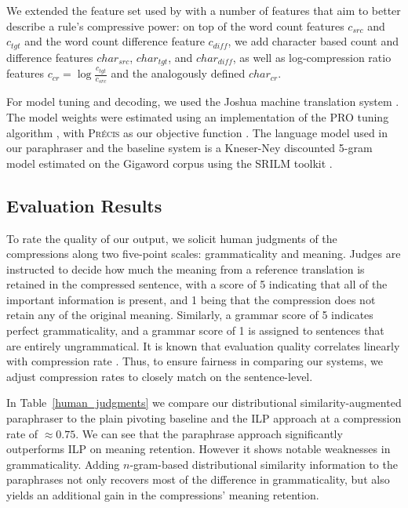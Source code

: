 \documentclass[11pt]{article}
\begin{document}
We extended the feature set used by  with a
number of features that aim to better describe a rule's compressive
power: on top of the word count features $c_{\mathit{src}}$ and
$c_{\mathit{tgt}}$ and the word count difference feature
$c_{\mathit{diff}}$, we add character based count and difference
features $\mathit{char}_{\mathit{src}}$,
$\mathit{char}_{\mathit{tgt}}$, and $\mathit{char}_{\mathit{diff}}$,
as well as log-compression ratio features $c_{\mathit{cr}} = \log
\frac{c_{\mathit{tgt}}}{c_{\mathit{src}}}$ and the analogously defined
$\mathit{char}_{\mathit{cr}}$.

For model tuning and decoding, we used the Joshua machine translation
system \cite{Joshua-3.0}. The model weights were estimated using an
implementation of the PRO tuning algorithm \cite{PRO2011}, with
\textsc{Pr\'ecis} as our objective function \cite{Ganitkevitch2011}.  The
language model used in our paraphraser and the 
baseline system is a Kneser-Ney discounted 5-gram model estimated on
the Gigaword corpus using the SRILM toolkit \cite{SRILM}.

\subsection{Evaluation Results}

To rate the quality of our output, we solicit human judgments of the
compressions along two five-point scales: grammaticality and
meaning. Judges are instructed to decide how much the meaning from a
reference translation is retained in the compressed sentence, with a
score of 5 indicating that all of the important information is
present, and 1 being that the compression does not retain any of the
original meaning. Similarly, a grammar score of 5 indicates perfect
grammaticality, and a grammar score of 1 is assigned to sentences that
are entirely ungrammatical. It is known that evaluation quality
correlates linearly with compression rate \cite{Napoles2011}. Thus, to
ensure fairness in comparing our systems, we adjust compression rates
to closely match on the sentence-level.

In Table~\ref{human_judgments} we compare our distributional
similarity-augmented paraphraser to the plain pivoting baseline and
the ILP approach at a compression rate of $\approx 0.75$. We can see
that the paraphrase approach significantly outperforms ILP on meaning
retention. However it shows notable weaknesses in
grammaticality. Adding $n$-gram-based distributional similarity
information to the paraphrases not only recovers most of the
difference in grammaticality, but also yields an additional gain in
the compressions' meaning retention.
\end{document}

